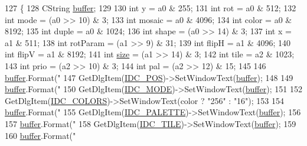 \begin{DoxyCode}
127 \{
128   CString \mbox{\hyperlink{_g_b_a_8cpp_a28d4d3d8445e73a696b2d6f7eadabd96}{buffer}};
129   
130   \textcolor{keywordtype}{int} y = a0 & 255;
131   \textcolor{keywordtype}{int} rot = a0 & 512;
132   \textcolor{keywordtype}{int} mode = (a0 >> 10) & 3;
133   \textcolor{keywordtype}{int} mosaic = a0 & 4096;
134   \textcolor{keywordtype}{int} color = a0 & 8192;
135   \textcolor{keywordtype}{int} duple = a0 & 1024;
136   \textcolor{keywordtype}{int} shape = (a0 >> 14) & 3;
137   \textcolor{keywordtype}{int} x = a1 & 511;
138   \textcolor{keywordtype}{int} rotParam = (a1 >> 9) & 31;
139   \textcolor{keywordtype}{int} flipH = a1 & 4096;
140   \textcolor{keywordtype}{int} flipV = a1 & 8192;
141   \textcolor{keywordtype}{int} \mbox{\hyperlink{expr-lex_8cpp_ab7d671599a7b25ca99a487fa341bc33a}{size}} = (a1 >> 14) & 3;
142   \textcolor{keywordtype}{int} tile = a2 & 1023;
143   \textcolor{keywordtype}{int} prio = (a2 >> 10) & 3;
144   \textcolor{keywordtype}{int} pal = (a2 >> 12) & 15;
145 
146   \mbox{\hyperlink{_g_b_a_8cpp_a28d4d3d8445e73a696b2d6f7eadabd96}{buffer}}.Format(\textcolor{stringliteral}{"%
147   GetDlgItem(\mbox{\hyperlink{resource_8h_a02c2891cbd5d20cc7658528c2281c0e5}{IDC\_POS}})->SetWindowText(\mbox{\hyperlink{_g_b_a_8cpp_a28d4d3d8445e73a696b2d6f7eadabd96}{buffer}});
148 
149   \mbox{\hyperlink{_g_b_a_8cpp_a28d4d3d8445e73a696b2d6f7eadabd96}{buffer}}.Format(\textcolor{stringliteral}{"%
150   GetDlgItem(\mbox{\hyperlink{resource_8h_a496f68890fb20f445e7456d458757bf2}{IDC\_MODE}})->SetWindowText(\mbox{\hyperlink{_g_b_a_8cpp_a28d4d3d8445e73a696b2d6f7eadabd96}{buffer}});
151 
152   GetDlgItem(\mbox{\hyperlink{resource_8h_af03e3bdf91d064ca235741d1176447ff}{IDC\_COLORS}})->SetWindowText(color ? \textcolor{stringliteral}{"256"} : \textcolor{stringliteral}{"16"});
153 
154   \mbox{\hyperlink{_g_b_a_8cpp_a28d4d3d8445e73a696b2d6f7eadabd96}{buffer}}.Format(\textcolor{stringliteral}{"%
155   GetDlgItem(\mbox{\hyperlink{resource_8h_a874a0d9bc0960c0638d30f28cd741c9f}{IDC\_PALETTE}})->SetWindowText(\mbox{\hyperlink{_g_b_a_8cpp_a28d4d3d8445e73a696b2d6f7eadabd96}{buffer}});
156 
157   \mbox{\hyperlink{_g_b_a_8cpp_a28d4d3d8445e73a696b2d6f7eadabd96}{buffer}}.Format(\textcolor{stringliteral}{"%
158   GetDlgItem(\mbox{\hyperlink{resource_8h_a6b1a2807d2c091a4c2714a7e45590ca1}{IDC\_TILE}})->SetWindowText(\mbox{\hyperlink{_g_b_a_8cpp_a28d4d3d8445e73a696b2d6f7eadabd96}{buffer}});
159 
160   \mbox{\hyperlink{_g_b_a_8cpp_a28d4d3d8445e73a696b2d6f7eadabd96}{buffer}}.Format(\textcolor{stringliteral}{"%
}}}}}
\end{DoxyCode}

